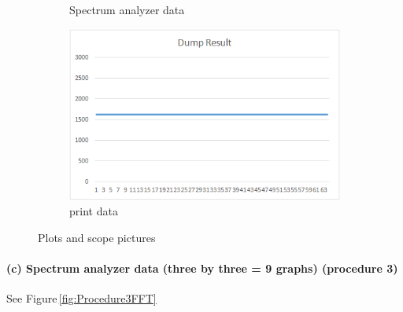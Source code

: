 \documentclass[a4paper]{article}
\newlength{\pic}
\begin{document}
\begin{figure}[htp]
\begin{subfigure}[H]{\picb}
	\caption{Spectrum analyzer data}
	\end{subfigure}
	\begin{subfigure}[H]{\picc}
	\includegraphics[width=\picc]{Plots/P3_2000}
	\caption{print data}
	\end{subfigure}
\caption{Plots and scope pictures}
\label{fig:Procedure3}
\end{figure}

\paragraph{(c) Spectrum analyzer data (three by three = 9 graphs) (procedure 3) \\}
See Figure\,\ref{fig:Procedure3FFT}

\setlength{\pica}{0.28\textwidth}
\setlength{\picb}{0.4\textwidth}
\setlength{\picc}{0.4\textwidth}
\end{document}
